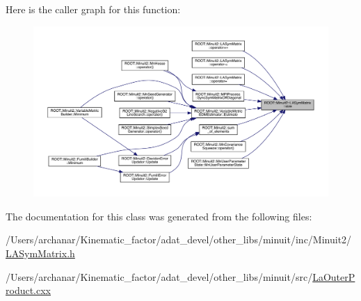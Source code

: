 Here is the caller graph for this function\+:\nopagebreak
\begin{figure}[H]
\begin{center}
\leavevmode
\includegraphics[width=350pt]{d3/d72/classROOT_1_1Minuit2_1_1LASymMatrix_af924c1e0eb1578716a8cb8940cc08563_icgraph}
\end{center}
\end{figure}


The documentation for this class was generated from the following files\+:\begin{DoxyCompactItemize}
\item 
/\+Users/archanar/\+Kinematic\+\_\+factor/adat\+\_\+devel/other\+\_\+libs/minuit/inc/\+Minuit2/\mbox{\hyperlink{other__libs_2minuit_2inc_2Minuit2_2LASymMatrix_8h}{L\+A\+Sym\+Matrix.\+h}}\item 
/\+Users/archanar/\+Kinematic\+\_\+factor/adat\+\_\+devel/other\+\_\+libs/minuit/src/\mbox{\hyperlink{LaOuterProduct_8cxx}{La\+Outer\+Product.\+cxx}}\end{DoxyCompactItemize}
